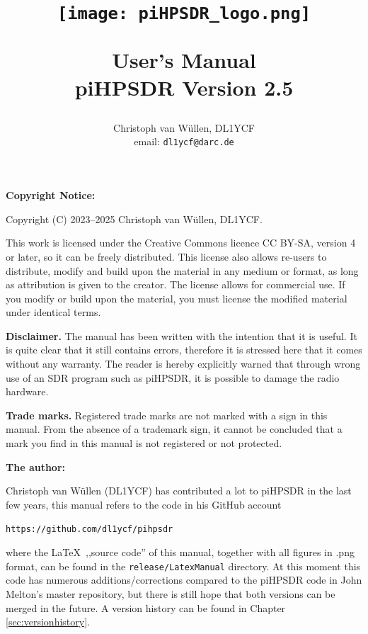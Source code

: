 \documentclass[12pt]{book}
\def\pH{pi\-HPSDR\xspace}
\begin{document}
\frontmatter
\title{
\begin{figure}
\center
\texttt{[image: piHPSDR\_logo.png]}
\end{figure}
User's Manual \\
\small{\pH Version 2.5}
}
\author{
Christoph van W\"ullen, DL1YCF \\
email: \texttt{dl1ycf@darc.de}
}

\maketitle
\textbf{Copyright Notice:}

Copyright (C) 2023--2025 Christoph van W\"ullen, DL1YCF.

This work is licensed under
the Creative Commons licence CC BY-SA, version 4 or later, so it can be freely distributed.
This license also allows re-users to distribute, modify and build upon the material in any medium or format,
as long as attribution is given to the creator. The license allows for commercial use.
If you modify or build upon the material, you must license the modified material under identical terms.

\textbf{Disclaimer.} The manual has been written with the intention that it is useful. It is quite clear
that it still contains errors, therefore it is stressed here that it comes without any warranty. The reader
is hereby explicitly warned that through wrong use of an SDR program such as \pH, it is possible to
damage the radio hardware.

\textbf{Trade marks.} Registered trade marks are not marked with a sign in this manual. From the absence of
a trademark sign, it cannot be concluded that a mark you find in this manual is not registered or not
protected.

\bigskip
\textbf{The author:}

Christoph van W\"ullen (DL1YCF) has contributed a lot to \pH in the last few years, this manual refers
to the code in his GitHub account

\texttt{https://github.com/dl1ycf/pihpsdr}

where the \LaTeX\   ,,source code'' of this manual, together with all figures in .png format, can be found
in the \texttt{release/LatexManual} directory. At this moment this code has numerous additions/corrections
compared
to the \pH code in John Melton's master repository, but there is still hope that both versions can
be merged in  the  future. A version history can be found in Chapter \ref{sec:versionhistory}.
\end{document}
